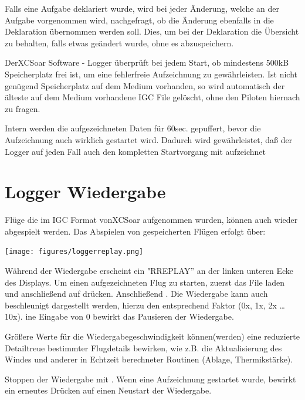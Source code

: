Falls eine Aufgabe deklariert wurde, wird bei jeder Änderung, welche an der Aufgabe vorgenommen wird, nachgefragt, ob die Änderung ebenfalls in die Deklaration übernommen werden soll. Dies, um bei der Deklaration die Übersicht zu behalten, falls etwas geändert wurde, ohne es abzuspeichern.

Der\textsf{XCSoar}  Software - Logger überprüft bei jedem Start, ob mindestens 500kB Speicherplatz frei ist, um eine fehlerfreie Aufzeichnung zu gewährleisten. \textcolor[rgb]{0.00,0.25,0.50}{Ist nicht genügend Speicherplatz auf dem Medium vorhanden, so wird automatisch der älteste auf dem Medium vorhandene IGC File gelöscht, ohne den Piloten hiernach zu fragen.}

Intern werden die aufgezeichneten Daten für 60sec. gepuffert, bevor die Aufzeichnung auch wirklich gestartet wird.  Dadurch wird gewährleistet, daß der Logger auf jeden Fall auch den kompletten Startvorgang mit aufzeichnet

\section{Logger Wiedergabe}
Flüge die im IGC Format von\textsf{XCSoar} aufgenommen wurden,  können   auch wieder abgespielt werden. Das Abspielen von gespeicherten Flügen erfolgt über:

\begin{quote}
\blink{}\blink{}
\end{quote}

\begin{center}
\texttt{[image: figures/loggerreplay.png]}
\end{center}

Während der Wiedergabe erscheint ein "RREPLAY'' an der linken unteren Ecke des Displays.
Um einen aufgezeichneten Flug zu starten, zuerst das File laden und anschließend auf  drücken. Anschließend . Die Wiedergabe kann auch beschleunigt dargestellt werden, hierzu den entsprechend Faktor  (0x, 1x, 2x \dots 10x).
 ine Eingabe von 0 bewirkt das Pausieren der Wiedergabe.

Größere Werte für die Wiedergabegeschwindigkeit können(werden) eine reduzierte Detailtreue  bestimmter Flugdetails bewirken, wie z.B. die Aktualisierung des Windes und anderer in Echtzeit berechneter Routinen (Ablage, Thermikstärke).

Stoppen der Wiedergabe mit  .
Wenn eine Aufzeichnung gestartet wurde, bewirkt ein erneutes Drücken auf  einen Neustart der Wiedergabe.

